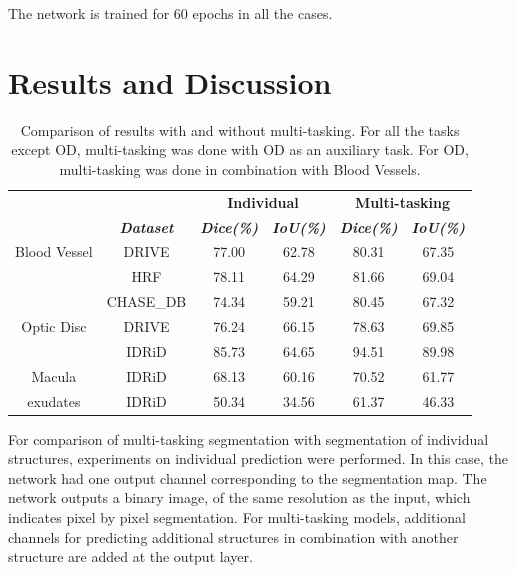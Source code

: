 \documentclass[utf8]{FrontiersinHarvard} %
\begin{document}
The network is trained for 60 epochs in all the cases.

\section{Results and Discussion}\label{sec:results}

\begin{table}[!h]
\caption{Comparison of results with and without multi-tasking. For all the tasks except OD, multi-tasking was done with OD as an auxiliary task. For OD, multi-tasking was done in combination with Blood Vessels.}
\begin{center}
\begin{tabular}{|c|c|c|c|c|c|}
\hline
&&\multicolumn{2}{|c|}{\textbf{Individual}}& \multicolumn{2}{|c|}{\textbf{Multi-tasking}} \\
\cline{3-6}
&\textbf{\textit{Dataset}}& \textbf{\textit{Dice(\%)}}& \textbf{\textit{IoU(\%)}}& \textbf{\textit{Dice(\%)}}& \textbf{\textit{IoU(\%)}}  \\
\hline
Blood Vessel & DRIVE & 77.00 & 62.78 & 80.31 & 67.35  \\
\cline{2-6}
& HRF & 78.11 & 64.29 & 81.66 & 69.04 \\
\cline{2-6}
& CHASE\_DB & 74.34 & 59.21 & 80.45 & 67.32 \\
\hline
Optic Disc & DRIVE & 76.24 & 66.15 & 78.63 & 69.85  \\
\cline{2-6}
&IDRiD & 85.73 & 64.65 & 94.51 & 89.98 \\
\hline
Macula & IDRiD & 68.13 & 60.16 & 70.52 &  61.77 \\
\hline
exudates & IDRiD & 50.34 & 34.56 & 61.37 & 46.33  \\
\hline
\end{tabular}
\label{tab:results}
\end{center}
\end{table}

For comparison of multi-tasking segmentation with segmentation of individual structures, experiments on individual prediction were performed. In this case, the network had one output channel corresponding to the segmentation map. The network outputs a binary image, of the same resolution as the input,  which indicates pixel by pixel segmentation. For multi-tasking models, additional channels for predicting additional structures  in combination with another structure are added at the output layer.
\end{document}
